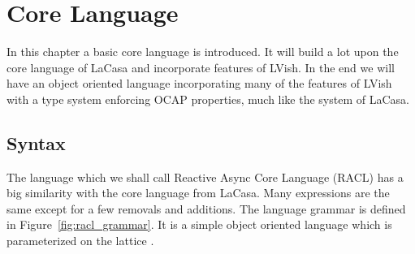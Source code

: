 \chapter{Core Language}%
\label{cha:core_language}

In this chapter a basic core language is introduced. It will build a lot upon
the core language of LaCasa and incorporate features of LVish. In the end we will
have an object oriented language incorporating many of the features of LVish with
a type system enforcing OCAP properties, much like the system of LaCasa.

\section{Syntax}
\label{sec:syntax}

The language which we shall call Reactive Async Core Language (RACL) has a big
similarity with the core language from LaCasa. Many expressions are the same
except for a few removals and additions. The language grammar is defined in
Figure~\ref{fig:racl_grammar}. It is a simple object oriented language which is
parameterized on the lattice \LatVals{}.

